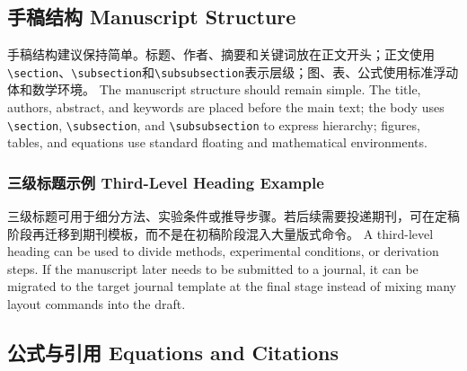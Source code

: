\documentclass[12pt,a4paper]{article}
\begin{document}
\subsection{手稿结构 Manuscript Structure}
\label{subsec:structure}

手稿结构建议保持简单。标题、作者、摘要和关键词放在正文开头；正文使用\verb|\section|、\verb|\subsection|和\verb|\subsubsection|表示层级；图、表、公式使用标准浮动体和数学环境。 The manuscript structure should remain simple. The title, authors, abstract, and keywords are placed before the main text; the body uses \verb|\section|, \verb|\subsection|, and \verb|\subsubsection| to express hierarchy; figures, tables, and equations use standard floating and mathematical environments.

\subsubsection{三级标题示例 Third-Level Heading Example}
\label{subsubsec:third-level}

三级标题可用于细分方法、实验条件或推导步骤。若后续需要投递期刊，可在定稿阶段再迁移到期刊模板，而不是在初稿阶段混入大量版式命令。 A third-level heading can be used to divide methods, experimental conditions, or derivation steps. If the manuscript later needs to be submitted to a journal, it can be migrated to the target journal template at the final stage instead of mixing many layout commands into the draft.

\subsection{公式与引用 Equations and Citations}
\label{subsec:equation}
\end{document}
